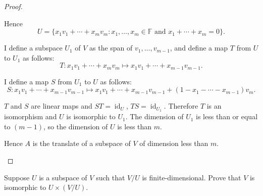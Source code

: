 \begin{proof}
\begin{enumerate}[label={(\alph*)}]
              Hence
              \[
                  U = \{ x_{1}v_{1} + \cdots + x_{m}v_{m} : x_{1}, \ldots, x_{m}\in \mathbb{F} \text{ and } x_{1} + \cdots + x_{m} = 0 \}.
              \]

              I define a subspace $U_{1}$ of $V$ as the span of $v_{1}, \ldots, v_{m-1}$, and define a map $T$ from $U$ to $U_{1}$ as follows:
              \[
                  T: x_{1}v_{1} + \cdots + x_{m}v_{m} \mapsto x_{1}v_{1} + \cdots + x_{m-1}v_{m-1}.
              \]

              I define a map $S$ from $U_{1}$ to $U$ as follows:
              \[
                  S: x_{1}v_{1} + \cdots + x_{m-1}v_{m-1} \mapsto x_{1}v_{1} + \cdots + x_{m-1}v_{m-1} + (1 - x_{1} - \cdots - x_{m-1})v_{m}.
              \]

              $T$ and $S$ are linear maps and $ST = \operatorname{id}_{U}$, $TS = \operatorname{id}_{U_{1}}$. Therefore $T$ is an isomorphism and $U$ is isomorphic to $U_{1}$. The dimension of $U_{1}$ is less than or equal to $(m - 1)$, so the dimension of $U$ is less than $m$.

              Hence $A$ is the translate of a subspace of $V$ of dimension less than $m$.
    \end{enumerate}
\end{proof}
\newpage

\begin{exercise}
    Suppose $U$ is a subspace of $V$ such that $V/U$ is finite-dimensional. Prove that $V$ is isomorphic to $U \times (V/U)$.
\end{exercise}

